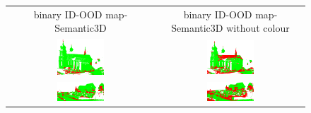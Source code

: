     \begin{figure}[h!]
        \centering
        \begin{tabular}{cc}
            binary ID-OOD map-Semantic3D & binary ID-OOD map-Semantic3D without colour \\
            \includegraphics[width=0.33\textwidth, height=0.18\textheight]{images/ood_imgs/sem3d_of/prob/fout_sem3d_OOD_1.pdf}&
            \includegraphics[width=0.33\textwidth, height=0.18\textheight]{images/ood_imgs/sem3d_of/prob/fout_sem3d_of_OOD_1.pdf}\\

            \includegraphics[width=0.33\textwidth, height=0.18\textheight]{images/ood_imgs/sem3d_of/prob/fout_sem3d_OOD_2.pdf}&
            \includegraphics[width=0.33\textwidth, height=0.18\textheight]{images/ood_imgs/sem3d_of/prob/fout_sem3d_of_OOD_2.pdf}\\


\end{tabular}
\end{figure}
